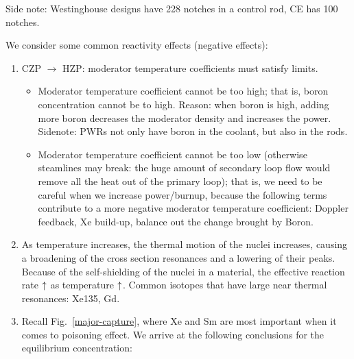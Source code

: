 \documentclass{school-22.211-notes}
\begin{document}
Side note: Westinghouse designs have 228 notches in a control rod, CE has 100 notches. 



\clearpage
{}
We consider some common reactivity effects (negative effects): 
\begin{enumerate}
\item CZP $\to$ HZP: moderator temperature coefficients must satisfy limits.
  \begin{itemize}
    \item Moderator temperature coefficient cannot be too high; that is, boron concentration cannot be to high. Reason: when boron is high, adding more boron decreases the moderator density and increases the power. Sidenote: PWRs not only have boron in the coolant, but also in the rods.
    \item Moderator temperature coefficient cannot be too low (otherwise steamlines may break: the huge amount of secondary loop flow would remove all the heat out of the primary loop); that is, we need to be careful when we increase power/burnup, because the following terms contribute to a more negative moderator temperature coefficient: Doppler feedback, Xe build-up, balance out the change brought by Boron. 
  \end{itemize}

\item {} As temperature increases, the thermal motion of the nuclei increases, causing a broadening of the cross section resonances and a lowering of their peaks. Because of the self-shielding of the nuclei in a material, the effective reaction rate $\uparrow$ as temperature $\uparrow$. Common isotopes that have large near thermal resonances: Xe135, Gd. 

\item {} Recall Fig.~\ref{major-capture}, where Xe and Sm are most important when it comes to poisoning effect. We arrive at the following conclusions for the equilibrium concentration: 


\end{enumerate}
\end{document}
